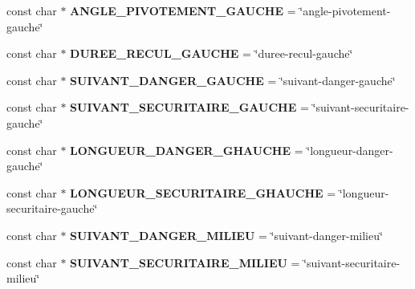 \begin{DoxyCompactItemize}
\item 
const char $\ast$ {\bfseries A\+N\+G\+L\+E\+\_\+\+P\+I\+V\+O\+T\+E\+M\+E\+N\+T\+\_\+\+G\+A\+U\+C\+HE} = \char`\"{}angle-\/pivotement-\/gauche\char`\"{}\hypertarget{class_element_x_m_l_a12374becba60944e9c5af2a08709a650}{}\label{class_element_x_m_l_a12374becba60944e9c5af2a08709a650}

\item 
const char $\ast$ {\bfseries D\+U\+R\+E\+E\+\_\+\+R\+E\+C\+U\+L\+\_\+\+G\+A\+U\+C\+HE} = \char`\"{}duree-\/recul-\/gauche\char`\"{}\hypertarget{class_element_x_m_l_a185f71490d4d062304b840c4cd652bfc}{}\label{class_element_x_m_l_a185f71490d4d062304b840c4cd652bfc}

\item 
const char $\ast$ {\bfseries S\+U\+I\+V\+A\+N\+T\+\_\+\+D\+A\+N\+G\+E\+R\+\_\+\+G\+A\+U\+C\+HE} = \char`\"{}suivant-\/danger-\/gauche\char`\"{}\hypertarget{class_element_x_m_l_a5e2fc31acc123410bf1f10777eb8beab}{}\label{class_element_x_m_l_a5e2fc31acc123410bf1f10777eb8beab}

\item 
const char $\ast$ {\bfseries S\+U\+I\+V\+A\+N\+T\+\_\+\+S\+E\+C\+U\+R\+I\+T\+A\+I\+R\+E\+\_\+\+G\+A\+U\+C\+HE} = \char`\"{}suivant-\/securitaire-\/gauche\char`\"{}\hypertarget{class_element_x_m_l_a1ae204b7829cddb5610a49cea85eece9}{}\label{class_element_x_m_l_a1ae204b7829cddb5610a49cea85eece9}

\item 
const char $\ast$ {\bfseries L\+O\+N\+G\+U\+E\+U\+R\+\_\+\+D\+A\+N\+G\+E\+R\+\_\+\+G\+H\+A\+U\+C\+HE} = \char`\"{}longueur-\/danger-\/gauche\char`\"{}\hypertarget{class_element_x_m_l_afedf281539b3c20481cfaa4756ec2dfe}{}\label{class_element_x_m_l_afedf281539b3c20481cfaa4756ec2dfe}

\item 
const char $\ast$ {\bfseries L\+O\+N\+G\+U\+E\+U\+R\+\_\+\+S\+E\+C\+U\+R\+I\+T\+A\+I\+R\+E\+\_\+\+G\+H\+A\+U\+C\+HE} = \char`\"{}longueur-\/securitaire-\/gauche\char`\"{}\hypertarget{class_element_x_m_l_a323c3ba150bd6548c00e5884298eec9a}{}\label{class_element_x_m_l_a323c3ba150bd6548c00e5884298eec9a}

\item 
const char $\ast$ {\bfseries S\+U\+I\+V\+A\+N\+T\+\_\+\+D\+A\+N\+G\+E\+R\+\_\+\+M\+I\+L\+I\+EU} = \char`\"{}suivant-\/danger-\/milieu\char`\"{}\hypertarget{class_element_x_m_l_a8d3b1a8bfdbb8ea198adfd6a1eb8b233}{}\label{class_element_x_m_l_a8d3b1a8bfdbb8ea198adfd6a1eb8b233}

\item 
const char $\ast$ {\bfseries S\+U\+I\+V\+A\+N\+T\+\_\+\+S\+E\+C\+U\+R\+I\+T\+A\+I\+R\+E\+\_\+\+M\+I\+L\+I\+EU} = \char`\"{}suivant-\/securitaire-\/milieu\char`\"{}\hypertarget{class_element_x_m_l_af6ce459494911549bc0adf27abec774d}{}\label{class_element_x_m_l_af6ce459494911549bc0adf27abec774d}


\end{DoxyCompactItemize}

